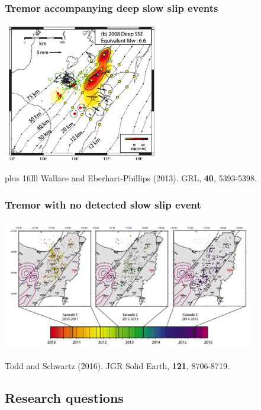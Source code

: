 \documentclass{beamer}
\newcommand{\btVFill}{\vskip0pt plus 1filll}
\begin{document}
	\begin{frame}
		\frametitle{Tremor accompanying deep slow slip events}
		\begin{center}
			\includegraphics[trim={0cm 0cm 0cm 0cm}, clip, width=7cm]{articles/wallace_eberhart-phillips_2013_3b.png}
		\end{center}
		\btVFill
		\tiny{Wallace and Eberhart-Phillips (2013). GRL, \textbf{40}, 5393-5398.}
	\end{frame}

	\begin{frame}
		\frametitle{Tremor with no detected slow slip event}
		\begin{center}
			\includegraphics[trim={0cm 0cm 0cm 0cm}, clip, width=11cm]{articles/todd_schwartz_2016_6.png}
		\end{center}
		\tiny{Todd and Schwartz (2016). JGR Solid Earth, \textbf{121}, 8706-8719.}
	\end{frame}


	\subsection{Research questions}
\end{document}
